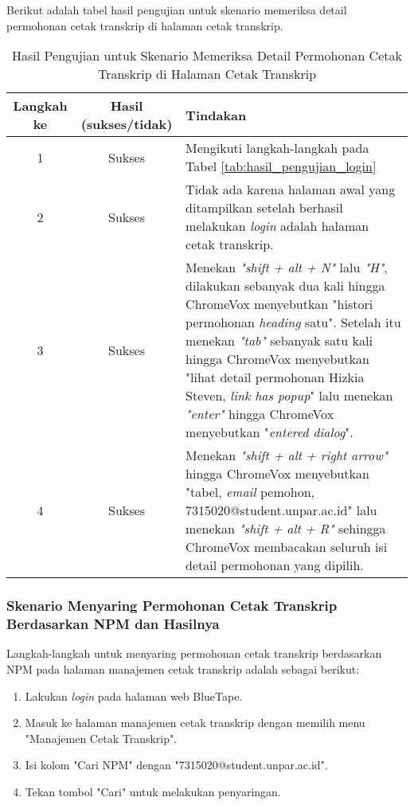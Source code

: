 Berikut adalah tabel hasil pengujian untuk skenario memeriksa detail permohonan cetak transkrip di halaman cetak transkrip.

\begin{table}[H]
    \centering 
    \caption{Hasil Pengujian untuk Skenario Memeriksa Detail Permohonan Cetak Transkrip di Halaman Cetak Transkrip}
    \label{tab:hasil_pengujian_memeriksa_detail_permohonan_cetak_transkrip_di_halaman_cetak_transkrip}
    \begin{tabular}{|c|c|p{10cm}|}
        \toprule
        Langkah ke & Hasil (sukses/tidak) & Tindakan \\

        \midrule
        1 & Sukses & Mengikuti langkah-langkah pada Tabel \ref{tab:hasil_pengujian_login} \\
        2 & Sukses & Tidak ada karena halaman awal yang ditampilkan setelah berhasil melakukan \textit{login} adalah halaman cetak transkrip. \\
        3 & Sukses & Menekan \textit{"shift + alt + N"} lalu \textit{"H"}, dilakukan sebanyak dua kali hingga ChromeVox menyebutkan "histori permohonan \textit{heading} satu". Setelah itu menekan \textit{"tab"} sebanyak satu kali hingga ChromeVox menyebutkan "lihat detail permohonan Hizkia Steven, \textit{link has popup}" lalu menekan \textit{"enter"} hingga ChromeVox menyebutkan "\textit{entered dialog}". \\
        4 & Sukses & Menekan \textit{"shift + alt + right arrow"} hingga ChromeVox menyebutkan "tabel, \textit{email} pemohon, 7315020@student.unpar.ac.id" lalu menekan \textit{"shift + alt + R"} sehingga ChromeVox membacakan seluruh isi detail permohonan yang dipilih. \\

        \bottomrule

    \end{tabular}
\end{table}

\subsubsection{Skenario Menyaring Permohonan Cetak Transkrip Berdasarkan NPM dan Hasilnya}
\label{subsubsec:skenario_menyaring_permohonan_cetak_transkrip_berdasarkan_npm}
Langkah-langkah untuk menyaring permohonan cetak transkrip berdasarkan NPM pada halaman manajemen cetak transkrip adalah sebagai berikut:

\begin{enumerate}
    \item Lakukan \textit{login} pada halaman web BlueTape.
    \item Masuk ke halaman manajemen cetak transkrip dengan memilih menu "Manajemen Cetak Transkrip".
    \item Isi kolom "Cari NPM" dengan "7315020@student.unpar.ac.id".
    \item Tekan tombol "Cari" untuk melakukan penyaringan.
\end{enumerate}

